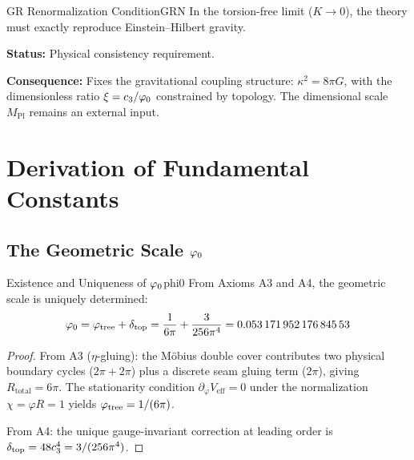 \begin{axiom}{GR Renormalization Condition}{GRN}
In the torsion-free limit ($K \to 0$), the theory must exactly reproduce 
Einstein--Hilbert gravity.

\tcblower
\textbf{Status:} Physical consistency requirement.

\textbf{Consequence:} Fixes the gravitational coupling structure:
$\kappa^2 = 8\pi G$, with the dimensionless ratio $\xi = c_3/\varphi_0$ constrained by topology.
The dimensional scale $M_{\mathrm{Pl}}$ remains an external input.
\end{axiom}

\section{Derivation of Fundamental Constants}

\subsection{\texorpdfstring{The Geometric Scale $\varphi_0$}{The Geometric Scale phi0}}

\begin{theorem}{Existence and Uniqueness of $\varphi_0$}{phi0}
From Axioms A3 and A4, the geometric scale is uniquely determined:
\begin{equation}
    \phiz = \phitree + \deltatop = \frac{1}{6\pi} + \frac{3}{256\pi^4} = \num[round-mode=places,round-precision=17]{\TFPTvarphiZeroNum}
\end{equation}
\end{theorem}

\begin{proof}
From A3 ($\eta$-gluing): the M\"obius double cover contributes two physical boundary
cycles ($2\pi+2\pi$) plus a discrete seam gluing term ($2\pi$), giving
$R_{\text{total}}=6\pi$. The stationarity condition $\partial_\varphi V_{\text{eff}} = 0$
under the normalization $\chi = \varphi R = 1$ yields $\varphi_{\mathrm{tree}} = 1/(6\pi)$.

From A4: the unique gauge-invariant correction at leading order is 
$\delta_{\mathrm{top}} = 48c_3^4 = 3/(256\pi^4)$.
\end{proof}

